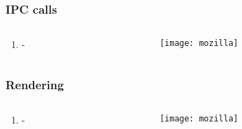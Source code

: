 \documentclass[
	notes=none,
	aspectratio=169
]{beamer}
\begin{document}

\begin{frame}
\frametitle{IPC calls}

\begin{columns}[T]
\begin{column}[T]{0.5\textwidth}
\setlength{\parskip}{0.5em}

\vspace{1.5cm}
\begin{enumerate}
\setlength{\parskip}{0.5em}
\item -
\end{enumerate}

\end{column}
\begin{column}[T]{0.5\textwidth}
\setlength{\parskip}{0.5em}

\vspace{0.5cm}
\texttt{[image: mozilla]}

\end{column}
\end{columns}

\end{frame}
\note{
\begin{enumerate}
\item -
\end{enumerate}
}


\begin{frame}
\frametitle{Rendering}

\begin{columns}[T]
\begin{column}[T]{0.5\textwidth}
\setlength{\parskip}{0.5em}

\vspace{1.5cm}
\begin{enumerate}
\setlength{\parskip}{0.5em}
\item -
\end{enumerate}

\end{column}
\begin{column}[T]{0.5\textwidth}
\setlength{\parskip}{0.5em}

\vspace{0.5cm}
\texttt{[image: mozilla]}

\end{column}
\end{columns}

\end{frame}
\note{
\begin{enumerate}
\item -
\end{enumerate}
}
\end{document}
